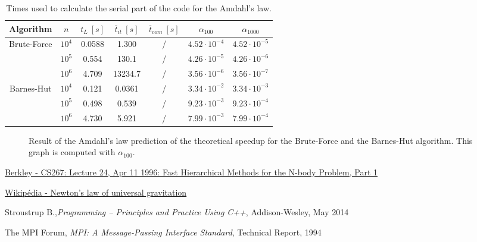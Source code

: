 \documentclass[11pt,a4paper]{article}
\begin{document}
\begin{table}[h]
\centering
\begin{tabular}{|c||c|c|c|c||c|c|}
\hline
Algorithm & $n$ & $t_L~[s]$ & $\overline{t}_{it}~[s]$ & $\overline{t}_{com}~[s]$ & $\alpha_{100}$ & $\alpha_{1000}$ \\
\hline \hline
\multirow{3}{*}{Brute-Force} & $10^4$ & 0.0588 & 1.300 & / & $4.52\cdot10^{-4}$ & $4.52\cdot10^{-5}$ \\ \cline{2-7}
& $10^5$ & 0.554 & 130.1 & / & $4.26\cdot10^{-5}$ & $4.26\cdot10^{-6}$ \\ \cline{2-7}
& $10^6$ & 4.709 & 13234.7 & / & $3.56\cdot10^{-6}$ & $3.56\cdot10^{-7}$ \\ \hline
\multirow{3}{*}{Barnes-Hut} & $10^4$ & 0.121 & 0.0361 & / & $3.34\cdot10^{-2}$ & $3.34\cdot10^{-3}$ \\ \cline{2-7}
& $10^5$ & 0.498 & 0.539 & / & $9.23\cdot10^{-3}$ & $9.23\cdot10^{-4}$ \\ \cline{2-7}
& $10^6$ & 4.730 & 5.921 & / & $7.99\cdot10^{-3}$ & $7.99\cdot10^{-4}$ \\ \hline
\end{tabular}
   \caption{Times used to calculate the serial part of the code for the Amdahl's law.}
   \label{tab:amdahl}  
\end{table}

\begin{figure}[H]
\centering

\caption{\label{fig:amdahl} Result of the Amdahl's law prediction of the theoretical speedup for the Brute-Force and the Barnes-Hut algorithm. This graph is computed with $\alpha_{100}$.}
\end{figure}


\begin{thebibliography}{1}

 \href{http://http.cs.berkeley.edu/~demmel/cs267/lecture26/lecture26.html}{Berkley - CS267: Lecture 24, Apr 11 1996: Fast Hierarchical Methods for the N-body Problem, Part 1}

 \href{https://en.wikipedia.org/wiki/Newton's\_law\_of\_universal\_gravitation}{Wikip\'edia - Newton's law of universal gravitation}

 Stroustrup B.,{\em Programming -- Principles and Practice Using C++}, Addison-Wesley, May 2014

 The MPI Forum, {\em MPI: A Message-Passing Interface Standard}, Technical Report, 1994

\end{thebibliography}
\end{document}
